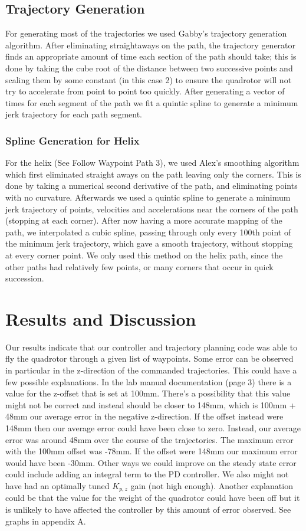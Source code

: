 \documentclass[english, twocolumn]{article}
\begin{document}
\subsection*{Trajectory Generation}
 For generating most of the trajectories we used Gabby's trajectory generation algorithm. After eliminating straightaways on the path, the trajectory generator finds an appropriate amount of time each section of the path should take; this is done by taking the cube root of the distance between two successive points and scaling them by some constant (in this case 2) to ensure the quadrotor will not try to accelerate from point to point too quickly. After generating a vector of times for each segment of the path we fit a  quintic spline to generate a minimum jerk trajectory for each path segment.  
 \subsubsection*{Spline Generation for Helix }
 For the helix (See  Follow Waypoint Path 3), we used Alex's smoothing algorithm which first eliminated straight aways on the path leaving only the corners. This is done by taking a numerical second derivative of the path, and eliminating points with no curvature. Afterwards we used a quintic spline to generate a minimum jerk trajectory of points, velocities and accelerations near the corners of the path (stopping at each corner). After now having a more accurate mapping of the path, we interpolated a cubic spline, passing through only every 100th point of the minimum jerk trajectory, which gave a smooth trajectory, without stopping at every corner point. We only used this method on the helix path, since the other paths had relatively few points, or many corners that occur in quick succession.


\section*{Results and Discussion}
Our results indicate that our controller and trajectory planning code was able to fly the quadrotor through a given list of waypoints.  Some error can be observed in particular in the z-direction of the commanded trajectories.  This could have a few possible explanations.  In the lab manual documentation (page 3) there is a value for the z-offset that is set at 100mm.  There’s a possibility that this value might not be correct and instead should be closer to 148mm, which is 100mm  + 48mm our average error in the negative z-direction.  If the offset instead were 148mm then our average error could have been close to zero.  Instead, our average error was around 48mm over the course of the trajectories.  The maximum error with the 100mm offset was -78mm. If the offset were 148mm our maximum error would have been -30mm.  Other ways we could improve on the steady state error could include adding an integral term to the PD controller.  We also might not have had an optimally tuned $K_{p,z}$  gain (not high enough).  Another explanation could be that the value for the weight of the quadrotor could have been off but it is unlikely to have affected the controller by this amount of error observed. See graphs in appendix A. 
\end{document}
